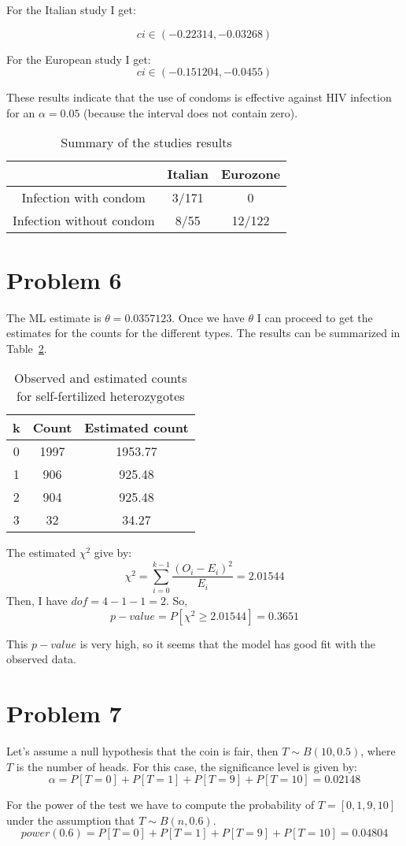 \documentclass[10pt]{article}
\begin{document}
For the Italian study I get:

\[
ci \in (-0.22314, -0.03268)
\]

For the European study I get:
\[
ci \in (-0.151204, -0.0455)
\]

These results indicate that the use of condoms is effective against HIV infection for 
an $\alpha=0.05$ (because the interval does not contain zero).




\begin{table}
  \centering
\begin{tabular}{c | c | c  }
  
                          & Italian     & Eurozone    \\ \hline
Infection with condom     & 3/171       & 0 \\ 
Infection without condom  & 8/55        & 12/122 \\ \hline 
\end{tabular}
\caption{Summary of the studies results}
\label{tab:condom} 
\end{table}


\section{Problem 6}

The ML estimate is $\theta=0.0357123$. Once we have $\theta$ I can proceed
to get the estimates for the counts for the different types. The results
can be summarized in Table~\ref{tab:count}.


\begin{table}
  \centering
\begin{tabular}{c | c | c  }
  
k    & Count     & Estimated count   \\ \hline 
0  & 1997  & 1953.77 \\
1  & 906  & 925.48 \\
2  & 904  & 925.48 \\
3  & 32  & 34.27 \\
\end{tabular}
\caption{Observed and estimated counts for self-fertilized heterozygotes}
\label{tab:count}
\end{table}


The estimated $\chi^2$ give by:
\[
 \chi^2 = \sum_{i=0}^{k-1} \frac{(O_i - E_i)^2}{E_i}=2.01544
\]
Then, I have $dof= 4-1 -1 =2$. So, 
\[
p-value = P[\chi^2 \geq 2.01544] = 0.3651
\]

This $p-value$ is very high, so it seems that the model has good fit with the observed data.

\section{Problem 7}
Let's assume a null hypothesis that the coin is fair, then $T \sim B(10,0.5)$, where $T$
is the number of heads. For this
case, the significance level is given by:
\[
\alpha = P[T = 0]+P[T=1] +P[T=9]+P[T=10] = 0.02148
\]

For the power of the test we have to compute the probability of $T=[0,1,9,10]$ under
the assumption that $T\sim B(n,0.6)$.
\[
power(0.6) = P[T = 0]+P[T=1] +P[T=9]+P[T=10] = 0.04804
\]
\end{document}

